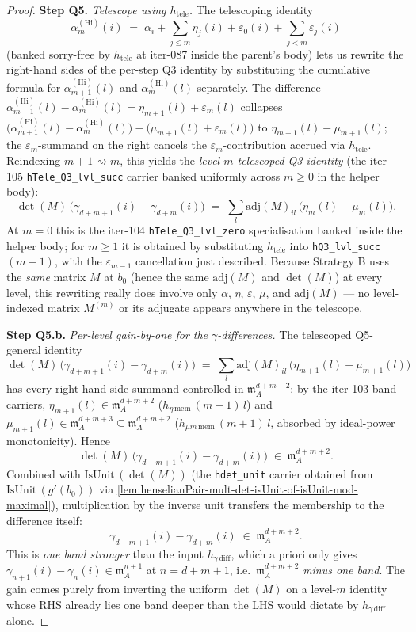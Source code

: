 \begin{proof}
\textbf{Step Q5.} \emph{Telescope using $h_{\mathrm{tele}}$.}
The telescoping identity
\[
\alpha^{(\mathrm{Hi})}_m(i)
\;=\; \alpha_i + \sum_{j \le m} \eta_j(i) + \varepsilon_0(i)
+ \sum_{j < m} \varepsilon_j(i)
\]
(banked sorry-free by $h_{\mathrm{tele}}$ at iter-087 inside the
parent's body) lets us rewrite the right-hand sides of the
per-step Q3 identity by substituting the cumulative formula for
$\alpha^{(\mathrm{Hi})}_{m+1}(l)$ and
$\alpha^{(\mathrm{Hi})}_m(l)$ separately. The difference
$\alpha^{(\mathrm{Hi})}_{m+1}(l) - \alpha^{(\mathrm{Hi})}_m(l) =
\eta_{m+1}(l) + \varepsilon_m(l)$ collapses
$\bigl(\alpha^{(\mathrm{Hi})}_{m+1}(l) -
\alpha^{(\mathrm{Hi})}_m(l)\bigr) - \bigl(\mu_{m+1}(l) +
\varepsilon_m(l)\bigr)$ to $\eta_{m+1}(l) - \mu_{m+1}(l)$; the
$\varepsilon_m$-summand on the right cancels the
$\varepsilon_m$-contribution accrued via $h_{\mathrm{tele}}$.
Reindexing $m + 1 \rightsquigarrow m$, this yields the
\emph{level-$m$ telescoped Q3 identity} (the iter-105
\texttt{hTele\_Q3\_lvl\_succ} carrier banked uniformly across
$m \ge 0$ in the helper body):
\[
\det(M)\,\bigl(\gamma_{d+m+1}(i) - \gamma_{d+m}(i)\bigr)
\;=\;
\sum_l \mathrm{adj}(M)_{il}\,\bigl(\eta_m(l) - \mu_m(l)\bigr).
\]
At $m = 0$ this is the iter-104 \texttt{hTele\_Q3\_lvl\_zero}
specialisation banked inside the helper body; for $m \ge 1$ it
is obtained by substituting $h_{\mathrm{tele}}$ into
\texttt{hQ3\_lvl\_succ}\,$(m-1)$, with the $\varepsilon_{m-1}$
cancellation just described. Because Strategy B uses the
\emph{same} matrix $M$ at $b_0$ (hence the same
$\mathrm{adj}(M)$ and $\det(M)$) at every level, this
rewriting really does involve only $\alpha$, $\eta$,
$\varepsilon$, $\mu$, and $\mathrm{adj}(M)$ — no level-indexed
matrix $M^{(m)}$ or its adjugate appears anywhere in the
telescope.

\textbf{Step Q5.b.} \emph{Per-level gain-by-one for the
$\gamma$-differences.} The telescoped Q5-general identity
\[
\det(M)\,\bigl(\gamma_{d+m+1}(i) - \gamma_{d+m}(i)\bigr)
\;=\;
\sum_l \mathrm{adj}(M)_{il}\,\bigl(\eta_{m+1}(l)
- \mu_{m+1}(l)\bigr)
\]
has every right-hand side summand controlled in
$\mathfrak m_A^{d+m+2}$: by the iter-103 band carriers,
$\eta_{m+1}(l) \in \mathfrak m_A^{d+m+2}$
($h_{\eta\,\mathrm{mem}}\,(m+1)\,l$) and
$\mu_{m+1}(l) \in \mathfrak m_A^{d+m+3} \subseteq
\mathfrak m_A^{d+m+2}$ ($h_{\mu m\,\mathrm{mem}}\,(m+1)\,l$,
absorbed by ideal-power monotonicity). Hence
\[
\det(M)\,\bigl(\gamma_{d+m+1}(i) - \gamma_{d+m}(i)\bigr)
\;\in\; \mathfrak m_A^{d+m+2}.
\]
Combined with $\mathrm{IsUnit}\,(\det(M))$ (the
\texttt{hdet\_unit} carrier obtained from
$\mathrm{IsUnit}\,(g'(b_0))$ via
\cref{lem:henselianPair-mult-det-isUnit-of-isUnit-mod-maximal}),
multiplication by the inverse unit transfers the membership to
the difference itself:
\[
\gamma_{d+m+1}(i) - \gamma_{d+m}(i) \;\in\;
\mathfrak m_A^{d+m+2}.
\]
This is \emph{one band stronger} than the input
$h_{\gamma\,\mathrm{diff}}$, which a priori only gives
$\gamma_{n+1}(i) - \gamma_n(i) \in \mathfrak m_A^{n+1}$ at
$n = d + m + 1$, i.e.\ $\mathfrak m_A^{d+m+2}$ \emph{minus one
band}. The gain comes purely from inverting the uniform
$\det(M)$ on a level-$m$ identity whose RHS already lies one
band deeper than the LHS would dictate by $h_{\gamma\,\mathrm{diff}}$
alone.


\end{proof}
